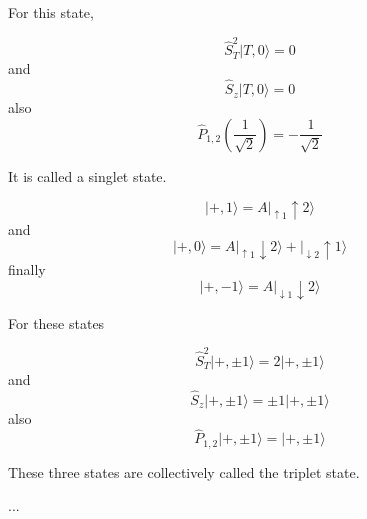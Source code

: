 \documentclass[12pt]{article}
\begin{document}
For this state,

\[
\hat{S}_T^2 | T,0\rangle = 0 
\]
and
\[
\hat{S}_{z}| T,0\rangle = 0 
\]
also
\[
\hat{P}_{1,2}\left( \frac{1}{\sqrt{2}} \right) = -\frac{1}{\sqrt{2}}
\]

It is called a singlet state.

\[
|+,1\rangle = A|_{\uparrow 1}\uparrow 2\rangle
\]
and
\[
|+,0\rangle = A|_{\uparrow 1}\downarrow 2\rangle + |_{\downarrow 2}\uparrow 1\rangle
\]
finally
\[
|+,-1\rangle = A|_{\downarrow 1}\downarrow 2\rangle
\]

For these states

\[
\hat{S}_T^2|+,\pm1\rangle = 2|+,\pm1\rangle
\]
and
\[
\hat{S}_z|+,\pm1\rangle = \pm1|+,\pm1\rangle
\]
also
\[
\hat{P}_{1,2}|+,\pm1\rangle = |+,\pm1\rangle
\]

These three states are collectively called the triplet state.

...
\end{document}
